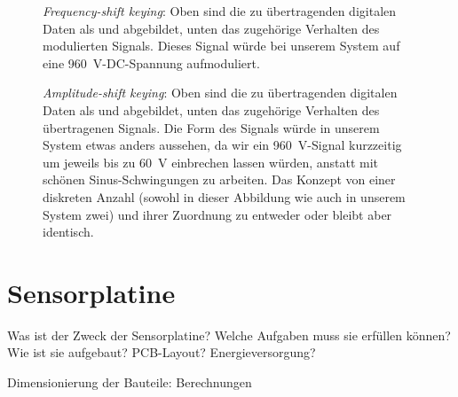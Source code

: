 \begin{figure}[h!tb]
    \centering
    
    \caption{%
        \emph{Frequency-shift  keying}: Oben   sind  die   zu  \"ubertragenden
        digitalen  Daten  als    und   abgebildet,  unten  das
        zugeh\"orige Verhalten des  modulierten Signals. Dieses Signal w\"urde
        bei unserem System auf eine \SI{960}{\volt}-DC-Spannung aufmoduliert.%
    }
    \label{fig:fsk:concept}
\end{figure}

\begin{figure}[h!tb]
    \centering
    
    \caption{%
        \emph{Amplitude-shift  keying}: Oben   sind  die   zu  \"ubertragenden
        digitalen  Daten  als    und   abgebildet,  unten  das
        zugeh\"orige  Verhalten  des   \"ubertragenen  Signals. Die  Form  des
        Signals w\"urde  in unserem System  etwas anders aussehen, da  wir ein
        \SI{960}{\volt}-Signal  kurzzeitig um  jeweils  bis zu  \SI{60}{\volt}
        einbrechen lassen  w\"urden, anstatt mit  sch\"onen Sinus-Schwingungen
        zu arbeiten. Das Konzept von einer  diskreten Anzahl (sowohl in dieser
        Abbildung  wie auch  in unserem  System zwei)  und ihrer  Zuordnung zu
        entweder  oder  bleibt aber identisch.%
    }
    \label{fig:ask:concept}
\end{figure}


\clearpage
\section{Sensorplatine}
\label{sec:hw:sensorplatine}

Was  ist der  Zweck  der Sensorplatine? Welche  Aufgaben  muss sie  erf\"ullen
k\"onnen? Wie ist sie aufgebaut? PCB-Layout? Energieversorgung?

\anweisung Dimensionierung der Bauteile: Berechnungen


